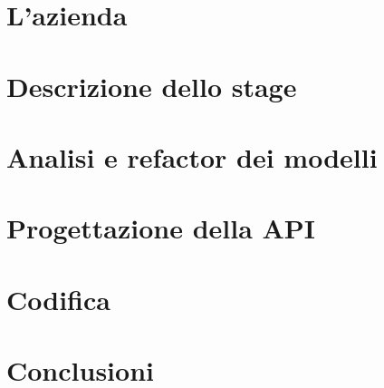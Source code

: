 \usepackage[backend=biber,style=verbose-ibid,hyperref,backref]{biblatex}

\usepackage{makecell}

\usepackage[outputdir=build]{minted}




  \frontmatter
  
  
  
  
  
  \cleardoublepage

  \mainmatter

  \chapter{L'azienda}
  \label{cap:azienda}   
  

  \chapter{Descrizione dello stage}
  \label{cap:descrizione-stage}
  

  \chapter{Analisi e refactor dei modelli}
  \label{cap:modelli}
  

  \chapter{Progettazione della API}
  \label{cap:api}
  
  
  \chapter{Codifica}
  \label{cap:codifica}
  

  \chapter{Conclusioni}
  \label{cap:conclusioni}
  
  
  \appendix

  \backmatter
  

